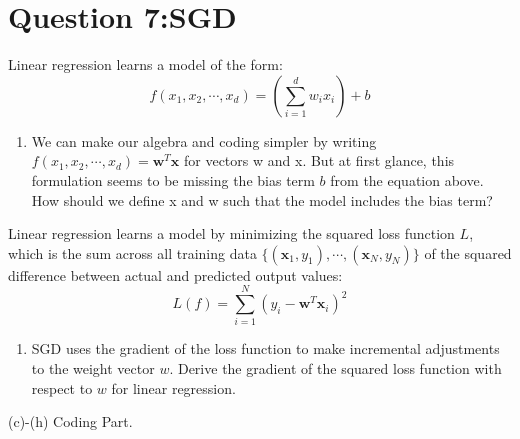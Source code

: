 \documentclass[
	12pt, %
]{fphw}
\begin{document}
\section*{Question 7:SGD}

\begin{problem}
	Linear regression learns a model of the form:
	$$f\left(x_{1},x_{2},\cdots,x_{d}\right)=\left(\sum_{i=1}^{d}w_{i}x_{i}\right)+b$$
	\begin{enumerate}
	\item We can make our algebra and coding simpler by writing $f\left(x_1,x_2,\cdots,x_d\right)=\mathbf{w}^T\mathbf{x}$ for vectors w and x. But at first glance, this formulation seems to be missing the bias term $b$ from the equation above. How should we define x and w such that the model includes the bias term?
	
\end{enumerate}
\medskip
Linear regression learns a model by minimizing the squared loss function $L$, which is the sum across all training data $\{(\mathbf{x}_1,y_1),\cdots,(\mathbf{x}_N,y_N)\}$ of the squared difference between actual and predicted output values:
$$L(f)=\sum_{i=1}^N\left(y_i-\mathbf{w}^T\mathbf{x}_i\right)^2$$
\begin{enumerate}
	\item  SGD uses the gradient of the loss function to make incremental adjustments to the weight vector $w$. Derive the gradient of the squared loss function with respect to $w$ for linear regression.
\end{enumerate}
(c)-(h) Coding Part.
\end{problem}
\end{document}
